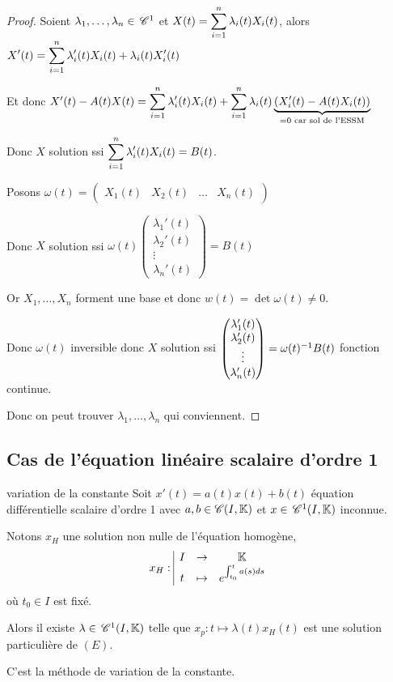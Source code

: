 \begin{proof}
    Soient $\lambda_1, \dots, \lambda_n \in \,\mathscr C^{1}$ et $X(t) = \displaystyle \sum_{i = 1}^{n} \lambda_i(t) X_i(t)$, alors
    $\displaystyle X'(t) = \sum_{i = 1}^{n} \lambda_i'(t) X_i(t) + \lambda_i(t) X_i'(t)$

    Et donc $X'(t) - A(t) X(t) = \displaystyle \sum_{i = 1}^{n} \lambda_i'(t) X_i(t) + \sum_{i = 1}^{n} \lambda_i(t) \underbrace{(X_i'(t) - A(t) X_i(t))}_{ = 0 \text{ car sol de l'ESSM}}$

    Donc $X$ solution ssi $\displaystyle \sum_{i = 1}^{n} \lambda_i'(t) X_i(t) = B(t)$.

    Posons $\omega(t) = \begin{pmatrix}
    X_1(t) & X_2(t) & \dots & X_n(t)
    \end{pmatrix}$

    Donc $X$ solution ssi $\omega(t) \begin{pmatrix}
    \lambda_1'(t) \\ \lambda_2'(t) \\ \vdots \\ \lambda_n'(t)
    \end{pmatrix} = B(t)$

    Or $X_1, \dots, X_n$ forment une base et donc $w(t) = \det \omega(t) \neq 0$.

    Donc $\omega(t)$ inversible donc $X$ solution ssi $\begin{pmatrix}
    \lambda_1'(t) \\ \lambda_2'(t) \\ \vdots \\ \lambda_n'(t)
    \end{pmatrix} = \omega(t)^{-1} B(t)$ fonction continue. 

    Donc on peut trouver $\lambda_1, \dots, \lambda_n$ qui conviennent. 
\end{proof}


\subsection{Cas de l'équation linéaire scalaire d'ordre 1}

\begin{theoreme}{variation de la constante}{}
    Soit $x'(t) = a(t) x(t) + b(t)$ équation différentielle scalaire d'ordre 1 avec 
    $a, b \in \mathscr C (I, \mathbb{K})$ et $x \in \,\mathscr C^{1}(I, \mathbb{K})$ inconnue. 

    Notons $x_H$ une solution non nulle de l'équation homogène, 
    $$x_H: \space \begin{array}{|ccc} \displaystyle I & \to & \displaystyle \mathbb{K} \\ \displaystyle t & \mapsto & \displaystyle e^{\int_{t_0}^t a(s) ds} \end{array}$$ où $t_0 \in I$ est fixé.

    Alors il existe $\lambda \in \,\mathscr C^{1}(I, \mathbb{K})$ telle que 
    $x_p : t \mapsto \lambda(t) x_H(t)$ est une solution particulière de $(E)$. 

    C'est la méthode de variation de la constante. 
\end{theoreme}

